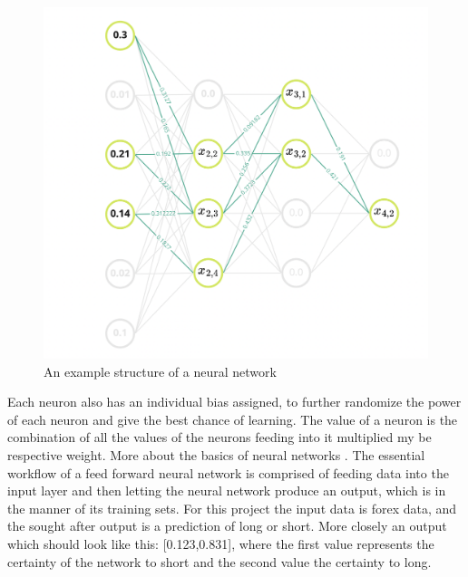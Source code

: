 \documentclass{article}
\begin{document}
\begin{figure}[!h]
\centering
\includegraphics[scale=0.24]{netimage.png}
\caption{\label{fig:neuralnet}An example structure of a neural network}
\end{figure}
\pagebreak
Each neuron also has an individual bias assigned, to further randomize the power of each neuron and give the best chance of learning. The value of a neuron is the combination of all the values of the neurons feeding into it multiplied my be respective weight. More about the basics of neural networks \cite{intro}. The essential workflow of a feed forward neural network is comprised of feeding data into the input layer and then letting the neural network produce an output, which is in the manner of its training sets. For this project the input data is forex data, and the sought after output is a prediction of long or short. More closely an output which should look like this: [0.123,0.831], where the first value represents the certainty of the network to short and the second value the certainty to long.\\~\\
\end{document}
